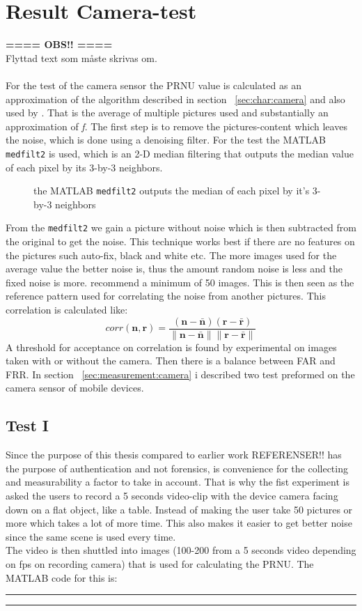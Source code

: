 \section{Result Camera-test}\label{sec:ResCam}
\textbf{ ==== OBS!! ====}\\ Flyttad text som måste skrivas om.\\
\\
For the test of the camera sensor the PRNU value is calculated as an approximation of the algorithm described in section ~\ref{sec:char:camera} and also used by \cite{sensor:camera:DCIdent}. That is the average of multiple pictures used and substantially an approximation of \textit{f}. The first step is to remove the pictures-content which leaves the noise, which is done using a denoising filter. For the test the MATLAB \texttt{medfilt2} is used, which is an 2-D median filtering that outputs the median value of each pixel by its 3-by-3 neighbors. 
\begin{figure}[H]
  \centering
  
  \caption{\label{fig:medfilt2} the MATLAB \texttt{medfilt2} outputs the median of each pixel by it's 3-by-3 neighbors}
\end{figure}
From the \texttt{medfilt2} we gain a picture without noise which is then subtracted from the original to get the noise. This technique works best if there are no features on the pictures such auto-fix, black and white etc. The more images used for the average value the better noise is, thus the amount random noise is less and the fixed noise is more. \cite{sensor:camera:DCIdent} recommend a minimum of 50 images. This is then seen as the reference pattern used for correlating the noise from another pictures. This correlation is calculated like:
$$
corr(\boldsymbol{n},\boldsymbol{r}) = 
\frac{(\boldsymbol{n} - \bar{\boldsymbol{n}})(\boldsymbol{r} - \bar{\boldsymbol{r}})}
{\|\boldsymbol{n} - \bar{\boldsymbol{n}}\| \|\boldsymbol{r} - \bar{\boldsymbol{r}}\|}
$$
A threshold for acceptance on correlation is found by experimental on images taken with or without the camera. Then there is a balance between FAR and FRR. 
In section ~\ref{sec:measurement:camera} i described two test preformed on the camera sensor of mobile devices.
\subsection{Test I}
Since the purpose of this thesis compared to earlier work REFERENSER!! has the purpose of authentication and not forensics, is convenience for the collecting and measurability a factor to take in account. That is why the fist experiment is asked the users to record a 5 seconds video-clip with the device camera facing down on a flat object, like a table. Instead of making the user take 50 pictures or more which takes a lot of more time. This also makes it easier to get better noise since the same scene is used every time. \\
The video is then shuttled into images (100-200 from a 5 seconds video depending on fps on recording camera) that is used for calculating the PRNU. The MATLAB code for this is:\\
\rule{\textwidth}{0.5pt}
  
\rule{\textwidth}{0.5pt}

